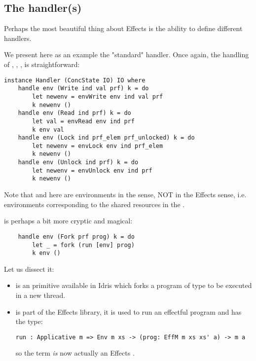 \subsection{The handler(s)}

Perhaps the most beautiful thing about Effects is the ability to define
different handlers. %

We present here as an example the "standard"  handler. Once again, the
handling of , , ,  is
straightforward:

\begin{verbatim}
instance Handler (ConcState IO) IO where
    handle env (Write ind val prf) k = do
        let newenv = envWrite env ind val prf
        k newenv ()
    handle env (Read ind prf) k = do
        let val = envRead env ind prf
        k env val
    handle env (Lock ind prf_elem prf_unlocked) k = do
        let newenv = envLock env ind prf_elem
        k newenv ()
    handle env (Unlock ind prf) k = do
        let newenv = envUnlock env ind prf
        k newenv ()
\end{verbatim}

Note that  and  here are environments in the
 sense, NOT in the Effects sense, i.e. environments corresponding
to the shared resources in the .

 is perhaps a bit more cryptic and magical:

\begin{verbatim}
    handle env (Fork prf prog) k = do
        let _ = fork (run [env] prog)
        k env ()
\end{verbatim}

Let us dissect it:

\begin{itemize}
    \item {} is an  primitive available in Idris which forks
        a program of type  to be executed in a new thread.
    \item {} is part of the Effects library, it is used to run an
    effectful program and has the type:
    \begin{verbatim}
run : Applicative m => Env m xs -> (prog: EffM m xs xs' a) -> m a
    \end{verbatim}
    so the term \code{[env]} \emph{is} now actually an Effects .
\end{itemize}

